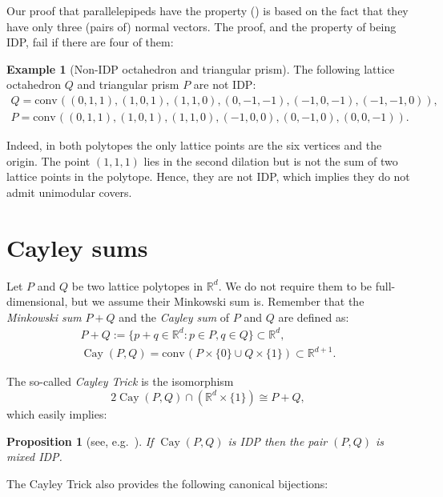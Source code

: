 \documentclass{amsart}
\theoremstyle{plain}
\newtheorem{proposition}[theorem]{Proposition}
\theoremstyle{definition}
\newtheorem{example}[theorem]{Example}
\newcommand{\R}{ \ensuremath{\mathbb{R}}}
\newcommand{\conv}{\ensuremath{\mathrm{conv}}\hspace{1pt}}
\newcommand{\cayley}{\operatorname{Cay}}
\begin{document}
Our proof that parallelepipeds have the property () is based on the fact that they have only three (pairs of) normal vectors. The proof, and the property of being IDP, fail if there are four of them:

\begin{example}[Non-IDP octahedron and triangular prism]
\label{ex:non-IDP}
The following lattice octahedron $Q$ and triangular prism $P$ are not IDP:
\begin{gather}
Q= \conv((0,1,1),(1,0,1),(1,1,0),(0,-1,-1),(-1,0,-1),(-1,-1,0)),\\
P=\conv((0,1,1),(1,0,1),(1,1,0),(-1,0,0),(0,-1,0),(0,0,-1)).
\end{gather}

Indeed, in both polytopes the only lattice points are the six vertices and the origin. The point $(1,1,1)$ lies in the second dilation but is not the sum of two lattice points in the polytope. Hence, they are not IDP, which implies they do not admit unimodular covers.
\end{example}

\section{ Cayley sums}
\label{sec:cayley}
Let $P$ and $Q$ be two lattice polytopes in $\R^d$. We do not require them to be full-dimensional, but we assume their Minkowski sum is. Remember that the \emph{Minkowski sum} $P+Q$ and the \emph{Cayley sum} of $P$ and $Q$ are defined as:
\begin{gather*}
P + Q := \{ p+q \in \R^d: p\in P, q \in Q\} \subset \R^d,\\
\cayley (P,Q) = \conv( P\times\{0\} \cup Q\times \{1\}) \subset \R^{d+1}.
\end{gather*}


The so-called \emph{Cayley Trick} is the isomorphism
\[
2\cayley(P, Q) \cap (\R^d\times \{1\}) \cong P+Q,
\]
which easily implies:

\begin{proposition}[see, e.g.~]
\label{prop:mixedIDP}
If $\cayley(P,Q)$ is IDP then the pair $(P,Q)$ is mixed IDP.
\end{proposition}


The Cayley Trick also provides the following canonical bijections:
\end{document}
